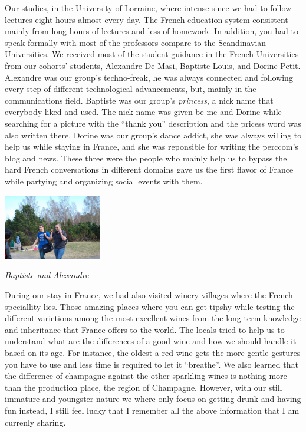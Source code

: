 \documentclass[10pt,a4paper]{article} %
\begin{document}
\begin{multicols}{3}
Our studies, in the University of Lorraine, where intense since we had to 
follow lectures eight hours almost every day. 
The French education system consistent mainly from long hours of lectures and less 
of homework. 
In addition, you had to speak formally with most of the professors compare to the 
Scandinavian Universities. 
We received most of the student guidance in the French Universities from our 
cohorts' students, Alexandre De Masi, Baptiste Louis, and Dorine Petit. 
Alexandre was our group's techno-freak, he was always connected and following 
every step of different technological advancements, but, mainly in the communications 
field. 
Baptiste was our group's \textit{princess}, a nick name that everybody liked and used. 
The nick name was given be me and Dorine while searching for a picture with the ``thank 
you'' description and the pricess word was also written there. 
Dorine was our group's dance addict, she was always willing to help us while 
staying in France, and she was reponsible for writing the {\sc perccom}'s blog and 
news.
These three were the people who mainly help us to bypass the hard French conversations 
in different domains gave us the first flavor of France while partying and organizing 
social events with them. 


\begin{center}
	\includegraphics[width=0.32\textwidth]{media/baptiste_alex.jpg}
	\par\textit{Baptiste and Alexandre}
\end{center} 


During our stay in France, we had also visited winery villages where the French 
speciallity lies. 
Those amazing places where you can get tipshy while testing the different varietions 
among the most excellent wines from the long term knowledge and inheritance that 
France offers to the world. 
The locals tried to help us to understand what are the differences of a good wine 
and how we should handle it based on its age. 
For instance, the oldest a red wine gets the more gentle gestures you have to use and 
less time is required to let it ``breathe''. 
We also learned that the difference of champagne against the other sparkling wines 
is nothing more than the production place, the region of Champagne. 
However, with our still immature and youngster nature we where only focus on getting 
drunk and having fun instead, I still feel lucky that I remember all the above 
information that I am currenly sharing. 



\end{multicols}
\end{document}
